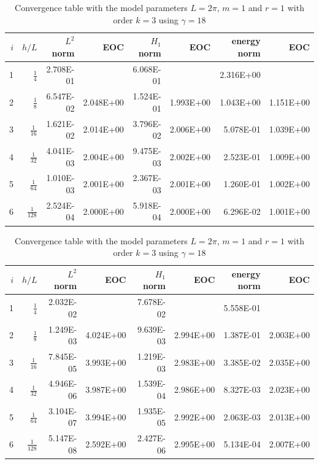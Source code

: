 \begin{table}
  \caption{\label{tab:ex2_order:a} Convergence table with the model parameters $L=2\pi$, $m=1$ and $r=1$ with order $k=2$ using $ \gamma = 9$}
  \begin{tabular}{rrrrrrrr}
    \hline\hline
    $i$&\textbf{$h/{L} $} & \textbf{$L^2$ norm} & \textbf{EOC} & \textbf{$H_1$ norm} & \textbf{EOC} & \textbf{energy norm} & \textbf{EOC} \\\hline
    1&$\frac{1}{4}$ & 2.708E-01 &  & 6.068E-01 &  & 2.316E+00 &  \\
    2&$\frac{1}{8}$ & 6.547E-02 & 2.048E+00 & 1.524E-01 & 1.993E+00 & 1.043E+00 & 1.151E+00 \\
    3&$\frac{1}{16}$ & 1.621E-02 & 2.014E+00 & 3.796E-02 & 2.006E+00 & 5.078E-01 & 1.039E+00 \\
    4&$\frac{1}{32}$ & 4.041E-03 & 2.004E+00 & 9.475E-03 & 2.002E+00 & 2.523E-01 & 1.009E+00 \\
    5&$\frac{1}{64}$ & 1.010E-03 & 2.001E+00 & 2.367E-03 & 2.001E+00 & 1.260E-01 & 1.002E+00 \\
    6&$\frac{1}{128}$ & 2.524E-04 & 2.000E+00 & 5.918E-04 & 2.000E+00 & 6.296E-02 & 1.001E+00 \\\hline\hline
  \end{tabular}

  \caption{\label{tab:ex2_order:b} Convergence table with the model parameters $L=2\pi$, $m=1$ and $r=1$ with order $k=3$ using $ \gamma = 18$}
  \begin{tabular}{rrrrrrrr}
    \hline\hline
    $i$&\textbf{$h/{L} $} & \textbf{$L^2$ norm} & \textbf{EOC} & \textbf{$H_1$ norm} & \textbf{EOC} & \textbf{energy norm} & \textbf{EOC} \\\hline
    1&$\frac{1}{4}$ & 2.032E-02 &  & 7.678E-02 &  & 5.558E-01 &  \\
    2&$\frac{1}{8}$ & 1.249E-03 & 4.024E+00 & 9.639E-03 & 2.994E+00 & 1.387E-01 & 2.003E+00 \\
    3&$\frac{1}{16}$ & 7.845E-05 & 3.993E+00 & 1.219E-03 & 2.983E+00 & 3.385E-02 & 2.035E+00 \\
    4&$\frac{1}{32}$ & 4.946E-06 & 3.987E+00 & 1.539E-04 & 2.986E+00 & 8.327E-03 & 2.023E+00 \\
    5&$\frac{1}{64}$ & 3.104E-07 & 3.994E+00 & 1.935E-05 & 2.992E+00 & 2.063E-03 & 2.013E+00 \\
    6&$\frac{1}{128}$ & 5.147E-08 & 2.592E+00 & 2.427E-06 & 2.995E+00 & 5.134E-04 & 2.007E+00 \\\hline\hline
  \end{tabular}


\end{table}
